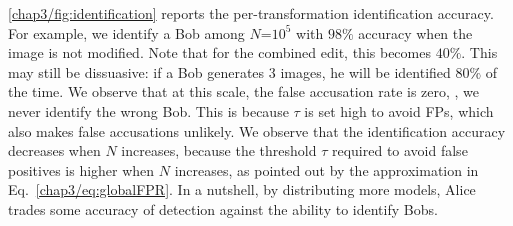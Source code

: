 \autoref{chap3/fig:identification} reports the per-transformation identification accuracy.
For example, we identify a Bob among $N$=$10^{5}$ with $98\%$ accuracy when the image is not modified.
Note that for the combined edit, this becomes $40\%$.
This may still be dissuasive:
if a Bob generates $3$ images, he will be identified $80\%$ of the time.
We observe that at this scale, the false accusation rate is zero, \ie, we never identify the wrong Bob.
This is because $\tau$ is set high to avoid FPs, which also makes false accusations unlikely.
We observe that the identification accuracy decreases when $N$ increases, because the threshold $\tau$ required to avoid false positives is higher when $N$ increases, as pointed out by the approximation in Eq.~\eqref{chap3/eq:globalFPR}.
In a nutshell, by distributing more models, Alice trades some accuracy of detection against the ability to identify Bobs.
